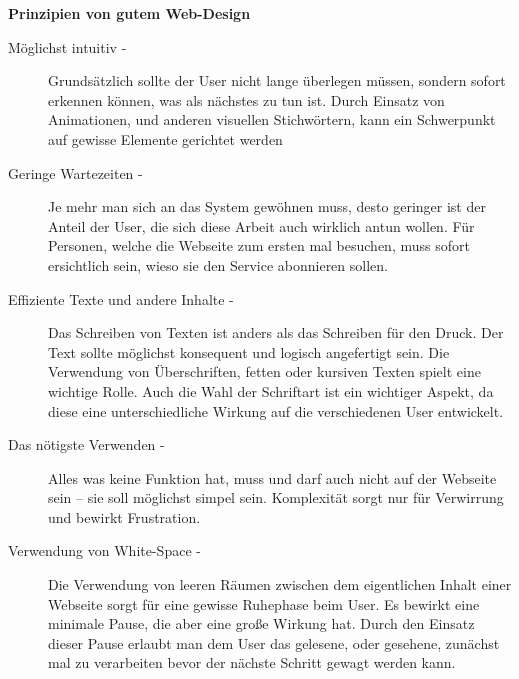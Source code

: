 \textbf{Prinzipien von gutem Web-Design}
\begin{description}
\item[Möglichst intuitiv -]
Grundsätzlich sollte der User nicht lange überlegen müssen, sondern sofort erkennen können, was als nächstes zu tun ist. Durch Einsatz von Animationen, und anderen visuellen Stichwörtern, kann ein Schwerpunkt auf gewisse Elemente gerichtet werden

\item[Geringe Wartezeiten -]
Je mehr man sich an das System gewöhnen muss, desto geringer ist der Anteil der User, die sich diese Arbeit auch wirklich antun wollen. Für Personen, welche die Webseite zum ersten mal besuchen, muss sofort ersichtlich sein, wieso sie den Service abonnieren sollen.

\item[Effiziente Texte und andere Inhalte -]
Das Schreiben von Texten ist anders als das Schreiben für den Druck. Der Text sollte möglichst konsequent und logisch angefertigt sein. Die Verwendung von Überschriften, fetten oder kursiven Texten spielt eine wichtige Rolle. Auch die Wahl der Schriftart ist ein wichtiger Aspekt, da diese eine unterschiedliche Wirkung auf die verschiedenen User entwickelt.

\item[Das nötigste Verwenden -]
Alles was keine Funktion hat, muss und darf auch nicht auf der Webseite sein – sie soll möglichst simpel sein. Komplexität sorgt nur für Verwirrung und bewirkt Frustration.

\item[Verwendung von White-Space -]
Die Verwendung von leeren Räumen zwischen dem eigentlichen Inhalt einer Webseite sorgt für eine gewisse Ruhephase beim User. Es bewirkt eine minimale Pause, die aber eine große Wirkung hat. Durch den Einsatz dieser Pause erlaubt man dem User das gelesene, oder gesehene, zunächst mal zu verarbeiten bevor der nächste Schritt gewagt werden kann.
\end{description}